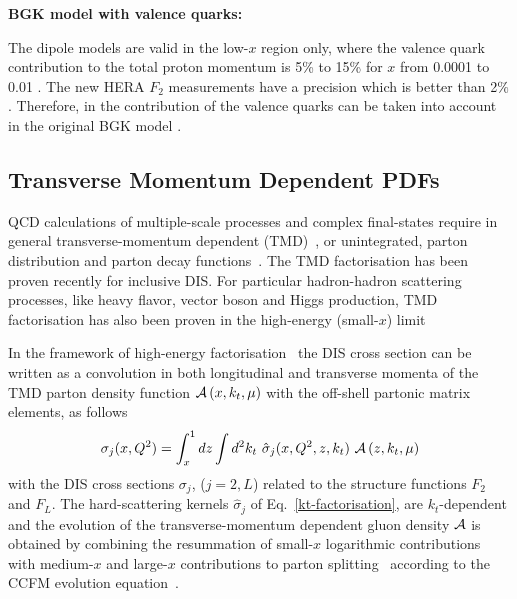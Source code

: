 \begin{description}
\vspace{0.1cm}
\item \bf {BGK model with valence quarks:} \rm

The dipole models are valid in the low-$x$ region only, where the valence quark contribution to the total proton momentum 
is 5\% to 15\% for $x$ from 0.0001 to 0.01 \cite{Collaboration:2010ry}.
The new HERA $F_2$ measurements have a precision which is better than 2$\%$. 
Therefore, in \fitter the contribution of the valence quarks can be taken into account in the original 
BGK model \cite{Luszczak:2013rxa}.
\end{description}

\subsection{Transverse Momentum Dependent PDFs}


\def\kt{\ensuremath{k_t}}
\def\pt{\ensuremath{p_t}}


QCD calculations of multiple-scale processes  and complex final-states
require in general transverse-momentum dependent (TMD)~\cite{Collins:2011zzd}, or 
unintegrated, parton distribution and parton decay 
functions~\cite{Aybat:2011zv,Buffing:2013eka,Buffing:2013kca,Buffing:2012sz,Mulders:2008tf,Jadach:2009gm,Hautmann:2009zzb,Hautmann:2012pf,Hautmann:2007gw}.   
The TMD factorisation has been proven recently \cite{Collins:2011zzd} for inclusive DIS. For 
particular hadron-hadron scattering processes, like heavy flavor, vector boson and Higgs production, 
TMD factorisation has also been proven in the high-energy (small-$x$) limit \cite{Catani:1990xk,Collins:1991ty,Hautmann:2010be}
  
In the framework of high-energy factorisation~\cite{Catani:1990xk,Catani:1990eg,Catani:1993ww} 
the DIS cross section can be written as a convolution in 
both longitudinal and transverse momenta of the TMD parton density function 
${\cal A}\left(x,\kt,\mu\right)$    
 with the off-shell partonic matrix elements, as follows 
\begin{equation}
 \sigma_j (x, Q^2) = \int_x^1  
d z \int d^2k_t \ 
\hat{\sigma}_j(x,Q^2,{z},k_t) \ 
 {\cal  A}\left( {z} ,\kt, \mu \right) 
\label{kt-factorisation}
\end{equation}
with the DIS cross sections 
$\sigma_j$, ($j= 2 , L$) related to the  structure functions $F_2$ and $F_L$.
The hard-scattering kernels ${\hat \sigma}_j$ of Eq.~\ref{kt-factorisation},    are $k_t$-dependent and the evolution  of the 
transverse-momentum dependent gluon density 
${\cal A} $ is obtained by combining the resummation of small-$x$ logarithmic 
contributions~\cite{Lipatov:1996ts,Fadin:1975cb,Balitsky:1978ic} with medium-$x$ and large-$x$ 
contributions to parton  splitting~\cite{Gribov:1972ri,Altarelli:1977zs,Dokshitzer:1977sg} according to the 
CCFM evolution equation~\cite{Ciafaloni:1987ur,Catani:1989sg,Marchesini:1994wr}.
  
